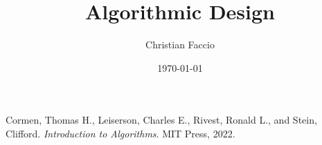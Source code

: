 \documentclass[a4paper,12pt]{report}
\institute{UniTs - University of Trieste}
\title{Algorithmic Design}
\author{Christian Faccio}
\date{\today}
\begin{document}
\maketitle



\toc






\begin{thebibliography}{9}
    Cormen, Thomas H., Leiserson, Charles E., Rivest, Ronald L., and Stein, Clifford. 
    \textit{Introduction to Algorithms}. 
    MIT Press, 2022.
\end{thebibliography}

\end{document}
